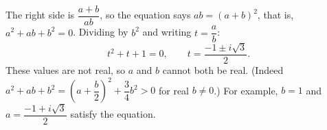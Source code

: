 The right side is $\dfrac{a+b}{ab}$, so the equation says $ab=(a+b)^2$, that is, $a^2+ab+b^2=0$. Dividing by $b^2$ and writing $t=\dfrac ab$:
\[t^2+t+1=0,\qquad t=\boxed{\dfrac{-1\pm i\sqrt3}{2}}.\]
These values are not real, so $a$ and $b$ cannot both be real. (Indeed $a^2+ab+b^2=\left(a+\dfrac b2\right)^2+\dfrac34b^2>0$ for real $b\ne0$.) For example, $b=1$ and $a=\dfrac{-1+i\sqrt3}{2}$ satisfy the equation.
